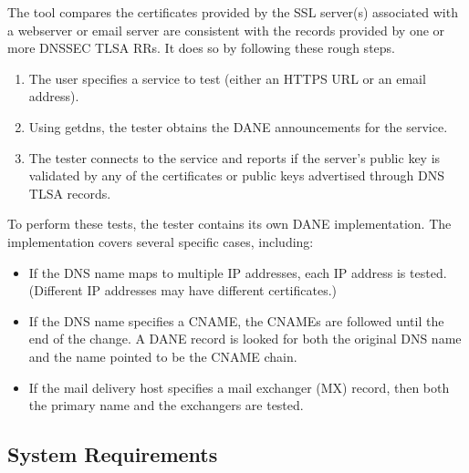 \documentclass[preprint,3p]{elsarticle}
\begin{document}
The tool compares the certificates provided by the
SSL server(s) associated with a webserver or email server are
consistent with the records provided by one or more DNSSEC TLSA
RRs. It does so by following these rough steps. 

\begin{enumerate}
\item The user specifies a service to test (either an HTTPS URL or an
  email address).
\item Using getdns, the tester obtains the DANE announcements for the
  service. 
\item The tester connects to the service and reports if the server's
  public key is validated by any of the   certificates or public keys
  advertised through DNS TLSA records. 
\end{enumerate}

To perform these tests, the tester contains its own DANE
implementation. The implementation covers several specific cases,
including:

\begin{itemize}
\item If the DNS name maps to multiple IP addresses, each IP address
  is tested. (Different IP addresses may have different certificates.)
\item If the DNS name specifies a CNAME, the CNAMEs are followed until
  the end of the change. A DANE record is looked for both the original
  DNS name and the name pointed to be the CNAME chain.
\item If the mail delivery host specifies a mail exchanger (MX)
  record, then both the primary name and the exchangers are tested.
\end{itemize}

\subsection{System Requirements}
\end{document}

